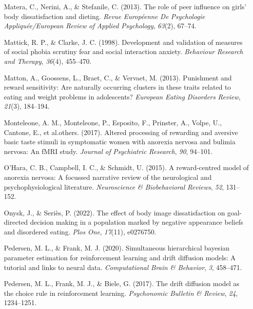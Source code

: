 \documentclass[
  man,floatsintext]{apa6}
\newlength{\cslhangindent}
\newlength{\cslentryspacingunit} %
\newenvironment{CSLReferences}[2] %
 {%
  \setlength{\parindent}{0pt}
  \ifodd #1
  \let\oldpar\par
  \def\par{\hangindent=\cslhangindent\oldpar}
  \fi
  \setlength{\parskip}{#2\cslentryspacingunit}
 }%
 {}
\begin{document}
\begin{CSLReferences}{1}{0}
\leavevmode{}%
Matera, C., Nerini, A., \& Stefanile, C. (2013). The role of peer influence on girls' body dissatisfaction and dieting. \emph{Revue Europ{é}enne De Psychologie Appliqu{é}e/European Review of Applied Psychology}, \emph{63}(2), 67--74.

\leavevmode{}%
Mattick, R. P., \& Clarke, J. C. (1998). Development and validation of measures of social phobia scrutiny fear and social interaction anxiety. \emph{Behaviour Research and Therapy}, \emph{36}(4), 455--470.

\leavevmode{}%
Matton, A., Goossens, L., Braet, C., \& Vervaet, M. (2013). Punishment and reward sensitivity: Are naturally occurring clusters in these traits related to eating and weight problems in adolescents? \emph{European Eating Disorders Review}, \emph{21}(3), 184--194.

\leavevmode{}%
Monteleone, A. M., Monteleone, P., Esposito, F., Prinster, A., Volpe, U., Cantone, E., et al.others. (2017). Altered processing of rewarding and aversive basic taste stimuli in symptomatic women with anorexia nervosa and bulimia nervosa: An fMRI study. \emph{Journal of Psychiatric Research}, \emph{90}, 94--101.

\leavevmode{}%
O'Hara, C. B., Campbell, I. C., \& Schmidt, U. (2015). A reward-centred model of anorexia nervosa: A focussed narrative review of the neurological and psychophysiological literature. \emph{Neuroscience \& Biobehavioral Reviews}, \emph{52}, 131--152.

\leavevmode{}%
Onysk, J., \& Seriès, P. (2022). The effect of body image dissatisfaction on goal-directed decision making in a population marked by negative appearance beliefs and disordered eating. \emph{Plos One}, \emph{17}(11), e0276750.

\leavevmode{}%
Pedersen, M. L., \& Frank, M. J. (2020). Simultaneous hierarchical bayesian parameter estimation for reinforcement learning and drift diffusion models: A tutorial and links to neural data. \emph{Computational Brain \& Behavior}, \emph{3}, 458--471.

\leavevmode{}%
Pedersen, M. L., Frank, M. J., \& Biele, G. (2017). The drift diffusion model as the choice rule in reinforcement learning. \emph{Psychonomic Bulletin \& Review}, \emph{24}, 1234--1251.


\end{CSLReferences}
\end{document}
